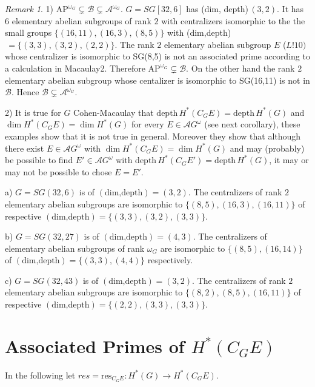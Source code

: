 \documentclass[reqno]{amsart}
\theoremstyle{plain}%
\theoremstyle{definition}
\theoremstyle{remark}
\newtheorem{remark}{Remark}
\newcommand\mc[1]{\mathcal #1}
\newcommand\dph{\text{depth}\,}
\begin{document}
\begin{remark}1) $\text{AP}^{\omega_G}\subsetneq\mc B\subsetneq \mc A^{\omega_G}$. $G=SG[32,6]$ has (dim, depth)$\,(3,2)$. It has $6$ elementary abelian subgroups of rank $2$ with centralizers isomorphic to the the small groups $\{(16,11),(16,3),(8,5)\}$ with (dim,depth)$\,=\{(3,3),(3,2),(2,2)\}$. The rank $2$ elementary abelian subgroup $E$ ($L!10)$ whose centralizer is isomorphic to SG(8,5) is not an associated prime according to a calculation in Macaulay2. Therefore  $\text{AP}^{\omega_G}\subsetneq\mc B$. On the other hand the rank $2$ elementary abelian subgroup whose centalizer is isomorphic to SG(16,11) is not in $\mc B$.  Hence $\mc B\subsetneq \mc A^{\omega_G}$.

\par 2) It is true for $G$ Cohen-Macaulay that 
$\dph H^*(C_GE)=\dph H^*(G)$ and $\dim H^*(C_GE)=\dim H^*(G)$ for every $E\in \mc AG^\omega$ (see next corollary), these examples show that it is not true in general.  Moreover they show that although there exist $E\in\mc AG^\omega$ with $\dim H^*(C_GE)=\dim H^*(G)$ and may (probably) be possible to find $E'\in\mc AG^\omega$ with $\dph H^*(C_GE')=\dph H^*(G)$, it may or may not be possible to chose $E=E'$.

\par a) $G=SG(32,6)$ is of $(\text{dim,depth})=(3,2)$.  The centralizers of rank $2$ elementary abelian subgroups are isomorphic to $\{(8,5),(16,3),(16,11)\}$ of respective   $(\text{dim,depth})=\{(3,3),(3,2),(3,3)\}$.  

b) $G=SG(32,27)$ is of $(\text{dim,depth})=(4,3)$.  The centralizers of elementary abelian subgroups of rank $\omega_G$ are isomorphic to $\{(8,5),(16,14)\}$ of $(\text{dim,depth})=\{(3,3),(4,4)\}$ respectively.

c) $G=SG(32,43)$ is of $(\text{dim,depth})=(3,2)$.  The centralizers of rank $2$ elementary abelian subgroups are isomorphic to $\{(8,2),(8,5),(16,11)\}$ of respective $(\text{dim,depth})=\{(2,2),(3,3),(3,3)\}$.  

\end{remark}

\section*{Associated Primes of $H^*(C_GE)$}

In the following let $ res=\text{res}_{C_GE}:H^*(G)\to H^*(C_GE)$.
\end{document}
